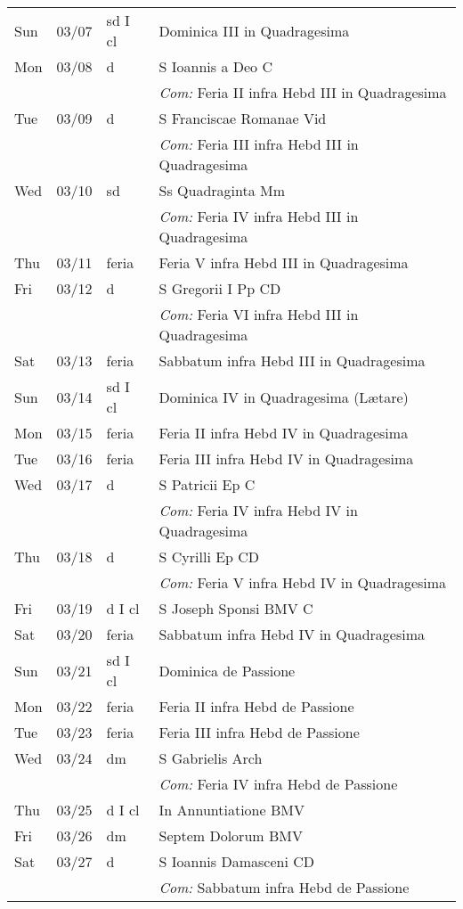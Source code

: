 \documentclass[10pt]{article}
\begin{document}
\begin{longtable}{ l l l l }
Sun & 03/07 & sd I cl & Dominica III in Quadragesima\\
Mon & 03/08 & d & S Ioannis a Deo C\\
 & & & \textit{Com:} Feria II infra Hebd III in Quadragesima\\
Tue & 03/09 & d & S Franciscae Romanae Vid\\
 & & & \textit{Com:} Feria III infra Hebd III in Quadragesima\\
Wed & 03/10 & sd & Ss Quadraginta Mm\\
 & & & \textit{Com:} Feria IV infra Hebd III in Quadragesima\\
Thu & 03/11 & feria & Feria V infra Hebd III in Quadragesima\\
Fri & 03/12 & d & S Gregorii I Pp CD\\
 & & & \textit{Com:} Feria VI infra Hebd III in Quadragesima\\
Sat & 03/13 & feria & Sabbatum infra Hebd III in Quadragesima\\
Sun & 03/14 & sd I cl & Dominica IV in Quadragesima (Lætare)\\
Mon & 03/15 & feria & Feria II infra Hebd IV in Quadragesima \\
Tue & 03/16 & feria & Feria III infra Hebd IV in Quadragesima \\
Wed & 03/17 & d & S Patricii Ep C\\
 & & & \textit{Com:} Feria IV infra Hebd IV in Quadragesima \\
Thu & 03/18 & d & S Cyrilli Ep CD\\
 & & & \textit{Com:} Feria V infra Hebd IV in Quadragesima \\
Fri & 03/19 & d I cl & S Joseph Sponsi BMV C\\
Sat & 03/20 & feria & Sabbatum infra Hebd IV in Quadragesima \\
Sun & 03/21 & sd I cl & Dominica de Passione\\
Mon & 03/22 & feria & Feria II infra Hebd de Passione\\
Tue & 03/23 & feria & Feria III infra Hebd de Passione\\
Wed & 03/24 & dm & S Gabrielis Arch\\
 & & & \textit{Com:} Feria IV infra Hebd de Passione\\
Thu & 03/25 & d I cl & In Annuntiatione BMV\\
Fri & 03/26 & dm & Septem Dolorum BMV\\
Sat & 03/27 & d & S Ioannis Damasceni CD\\
 & & & \textit{Com:} Sabbatum infra Hebd de Passione\\

\end{longtable}
\end{document}

